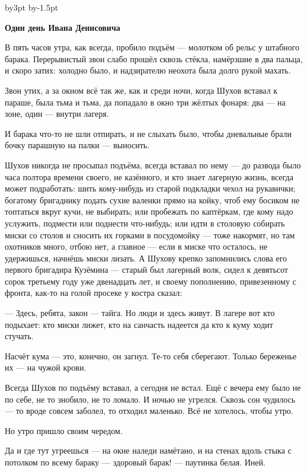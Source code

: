 
\advance\hsize by3pt
\advance\pdfhorigin by-1.5pt

\centerline{\bf Один день Ивана Денисовича}

\bigskip

В пять часов утра, как всегда, пробило подъём --- молотком об рельс у штабного барака. Перерывистый звон слабо прошёл сквозь стёкла, намёрзшие в два пальца, и скоро затих: холодно было, и надзирателю неохота была долго рукой махать.

Звон утих, а за окном всё так же, как и среди ночи, когда Шухов вставал к параше, была тьма и тьма, да попадало в окно три жёлтых фонаря: два --- на зоне, один --- внутри лагеря.

И барака что-то не шли отпирать, и не слыхать было, чтобы дневальные брали бочку парашную на палки --- выносить.

Шухов никогда не просыпал подъёма, всегда вставал по нему --- до развода было часа полтора времени своего, не казённого, и кто знает лагерную жизнь, всегда может подработать: шить кому-нибудь из старой подкладки чехол на рукавички; богатому бригаднику подать сухие валенки прямо на койку, чтоб ему босиком не топтаться вкруг кучи, не выбирать; или пробежать по каптёркам, где кому надо услужить, подмести или поднести что-нибудь; или идти в столовую собирать миски со столов и сносить их горками в посудомойку --- тоже накормят, но там охотников много, отбою нет, а главное --- если в миске что осталось, не удержишься, начнёшь миски лизать. А Шухову крепко запомнились слова его первого бригадира Кузёмина --- старый был лагерный волк, сидел к девятьсот сорок третьему году уже двенадцать лет, и своему пополнению, привезенному с фронта, как-то на голой просеке у костра сказал:

--- Здесь, ребята, закон --- тайга. Но люди и здесь живут. В лагере вот кто подыхает: кто миски лижет, кто на санчасть надеется да кто к куму ходит стучать.

Насчёт кума --- это, конечно, он загнул. Те-то себя сберегают. Только береженье их --- на чужой крови.

Всегда Шухов по подъёму вставал, а сегодня не встал. Ещё с вечера ему было не по себе, не то знобило, не то ломало. И ночью не угрелся. Сквозь сон чудилось --- то вроде совсем заболел, то отходил маленько. Всё не хотелось, чтобы утро.

Но утро пришло своим чередом.

Да и где тут угреешься --- на окне наледи намётано, и на стенах вдоль стыка с потолком по всему бараку --- здоровый барак! --- паутинка белая. Иней.

